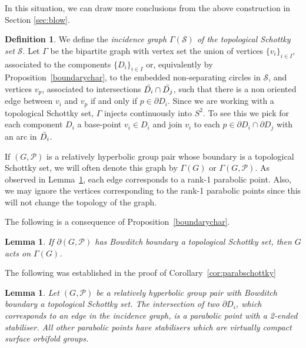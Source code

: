 \documentclass[11pt]{article}
\newtheorem{lemma}[theorem]{Lemma}
\theoremstyle{definition}
\newtheorem{definition}[theorem]{Definition}
\newcommand\PP{\mathcal{P}}
\begin{document}
In this situation, we can draw more conclusions from the above construction in Section \ref{sec:blow}. 

\begin{definition} We define the \emph{incidence graph $\Gamma(\mathcal{S})$ of the topological Schottky set $\mathcal{S}$}.  
Let $\Gamma$ be the bipartite graph with vertex set the union of vertices $\{v_i\}_{i\in I}$, associated to the components 
$\{D_i\}_{i\in I}$ or, equivalently by Proposition~\ref{boundarychar}, to the embedded non-separating circles in $\mathcal{S}$, and vertices $v_p$, associated to intersections $\Bar{D_i}\cap \Bar{D_j}$, such that there is a non oriented edge between $v_i$ and $v_p$ if and only if $p\in \partial D_i$. 
Since we are working with a topological Schottky set, 
 $\Gamma$ injects continuously into $S^2$. 
To see this we pick for each component $D_i$ a base-point $v_i\in D_i$ and join $v_i$ to each $p\in \partial D_i \cap \partial D_j$ with an arc in $\Bar{D_i}$. 


If $(G, \mathcal{P})$ is a relatively hyperbolic group pair whose boundary is a topological Schottky set, we will often denote this graph by $\Gamma(G)$ or $\Gamma(G, \mathcal{P})$. As observed in Lemma~\ref{lem:parabschottky}, each edge corresponds to a rank-1 parabolic point.
Also, we may ignore the vertices corresponding to the rank-1 parabolic points since this will not change the topology of the graph. 

\end{definition} 


The following is a consequence of Proposition~\ref{boundarychar}.

\begin{lemma} 
If $\partial(G, \mathcal{P})$ has Bowditch boundary a topological Schottky set, then $G$ acts on $\Gamma(G)$. \end{lemma} 

The following was established in the proof of Corollary~\ref{cor:parabschottky}
    
\begin{lemma}\label{lem:parabschottky} 
Let $(G,\PP)$ be a relatively hyperbolic group pair with Bowditch boundary a topological Schottky
set.  The intersection of two $\partial D_i$, which corresponds to an edge in the incidence graph, is a parabolic point with a 2-ended stabiliser. All other parabolic points have stabilisers  
which are virtually
 compact surface orbifold groups. \end{lemma}
\end{document}
